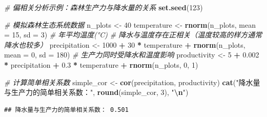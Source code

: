 \documentclass[
  twoside,12pt,fontset=none]{ctexbook}
\newenvironment{Shaded}{\begin{snugshade}}{\end{snugshade}}
\newcommand{\AttributeTok}[1]{\textcolor[rgb]{0.13,0.29,0.53}{#1}}
\newcommand{\CommentTok}[1]{\textcolor[rgb]{0.56,0.35,0.01}{\textit{#1}}}
\newcommand{\DecValTok}[1]{\textcolor[rgb]{0.00,0.00,0.81}{#1}}
\newcommand{\FloatTok}[1]{\textcolor[rgb]{0.00,0.00,0.81}{#1}}
\newcommand{\FunctionTok}[1]{\textcolor[rgb]{0.13,0.29,0.53}{\textbf{#1}}}
\newcommand{\NormalTok}[1]{#1}
\newcommand{\OtherTok}[1]{\textcolor[rgb]{0.56,0.35,0.01}{#1}}
\newcommand{\SpecialCharTok}[1]{\textcolor[rgb]{0.81,0.36,0.00}{\textbf{#1}}}
\newcommand{\StringTok}[1]{\textcolor[rgb]{0.31,0.60,0.02}{#1}}
\begin{document}
\begin{Shaded}
\begin{Highlighting}[]
\CommentTok{\# 偏相关分析示例：森林生产力与降水量的关系}
\FunctionTok{set.seed}\NormalTok{(}\DecValTok{123}\NormalTok{)}

\CommentTok{\# 模拟森林生态系统数据}
\NormalTok{n\_plots }\OtherTok{\textless{}{-}} \DecValTok{40}
\NormalTok{temperature }\OtherTok{\textless{}{-}} \FunctionTok{rnorm}\NormalTok{(n\_plots, }\AttributeTok{mean =} \DecValTok{15}\NormalTok{, }\AttributeTok{sd =} \DecValTok{3}\NormalTok{) }\CommentTok{\# 年平均温度(°C)}
\CommentTok{\# 降水与温度存在正相关（温度较高的样方通常降水也较多）}
\NormalTok{precipitation }\OtherTok{\textless{}{-}} \DecValTok{1000} \SpecialCharTok{+} \DecValTok{30} \SpecialCharTok{*}\NormalTok{ temperature }\SpecialCharTok{+} \FunctionTok{rnorm}\NormalTok{(n\_plots, }\AttributeTok{mean =} \DecValTok{0}\NormalTok{, }\AttributeTok{sd =} \DecValTok{180}\NormalTok{)}
\CommentTok{\# 生产力同时受降水和温度影响}
\NormalTok{productivity }\OtherTok{\textless{}{-}} \DecValTok{5} \SpecialCharTok{+} \FloatTok{0.002} \SpecialCharTok{*}\NormalTok{ precipitation }\SpecialCharTok{+} \FloatTok{0.3} \SpecialCharTok{*}\NormalTok{ temperature }\SpecialCharTok{+} \FunctionTok{rnorm}\NormalTok{(n\_plots, }\DecValTok{0}\NormalTok{, }\DecValTok{1}\NormalTok{)}

\CommentTok{\# 计算简单相关系数}
\NormalTok{simple\_cor }\OtherTok{\textless{}{-}} \FunctionTok{cor}\NormalTok{(precipitation, productivity)}
\FunctionTok{cat}\NormalTok{(}\StringTok{"降水量与生产力的简单相关系数："}\NormalTok{, }\FunctionTok{round}\NormalTok{(simple\_cor, }\DecValTok{3}\NormalTok{), }\StringTok{"}\SpecialCharTok{\textbackslash{}n}\StringTok{"}\NormalTok{)}
\end{Highlighting}
\end{Shaded}

\begin{verbatim}
## 降水量与生产力的简单相关系数： 0.501
\end{verbatim}

\begin{Shaded}
\end{Shaded}
\end{document}
